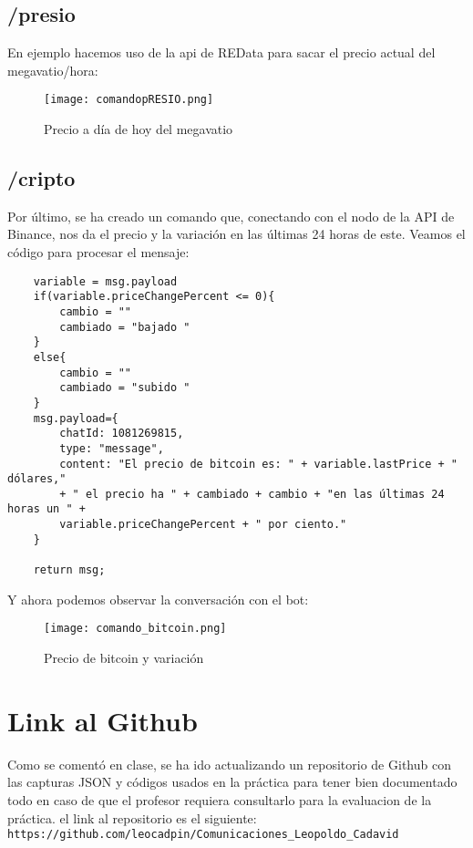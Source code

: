 \documentclass[12pt]{article}
\begin{document}
\subsection{/presio}

En ejemplo hacemos uso de la api de REData para sacar el  precio actual del megavatio/hora:

\begin{figure}[H]
    \centering
    \texttt{[image: comandopRESIO.png]}
    \caption{Precio a día de hoy del megavatio}
    \label{presio}
\end{figure}

\subsection{/cripto}

Por último, se ha creado un comando que, conectando con el nodo de la API de Binance, nos da el precio y la variación en las últimas 
24 horas de este. Veamos el código para procesar el mensaje:

\begin{verbatim}
    variable = msg.payload
    if(variable.priceChangePercent <= 0){
        cambio = ""
        cambiado = "bajado "
    }
    else{
        cambio = ""
        cambiado = "subido "
    }
    msg.payload={
        chatId: 1081269815,
        type: "message",
        content: "El precio de bitcoin es: " + variable.lastPrice + " dólares,"
        + " el precio ha " + cambiado + cambio + "en las últimas 24 horas un " +
        variable.priceChangePercent + " por ciento."
    }
    
    return msg;

\end{verbatim}    

Y ahora podemos observar la conversación con el bot:

\begin{figure}[H]
    \centering
    \texttt{[image: comando\_bitcoin.png]}
    \caption{Precio de bitcoin y variación}
    \label{presiobtc}
\end{figure}

\section{Link al Github}
Como se comentó en clase, se ha ido actualizando un repositorio de Github con las capturas JSON y códigos usados en la práctica para tener bien documentado todo en caso de que el profesor
requiera consultarlo para la evaluacion de la práctica. el link al repositorio es el siguiente:\\

\verb|https://github.com/leocadpin/Comunicaciones_Leopoldo_Cadavid|
\end{document}

